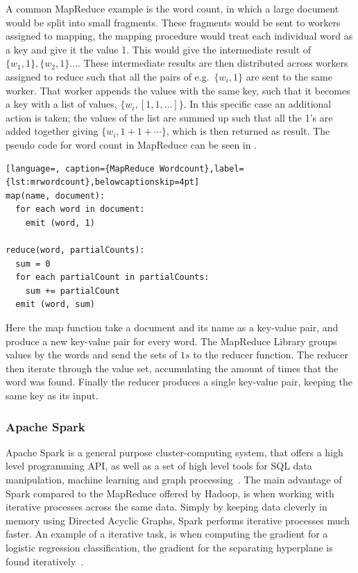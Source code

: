 A common MapReduce example is the word count, in which a large document would be split into small fragments. These fragments would be sent to workers assigned to mapping, the mapping procedure would treat each individual word as a key and give it the value 1. This would give the intermediate result of $\{w_1,1\}, \{w_2,1\} \dots$. These intermediate results are then distributed across workers assigned to reduce such that all the pairs of e.g.\ $\{w_i,1\}$ are sent to the same worker. That worker appends the values with the same key, such that it becomes a key with a list of values, $\{w_i, [1,1,\dots] \}$. In this specific case an additional action is taken; the values of the list are summed up such that all the 1's are added together giving $\{w_i,1+1+\cdots \}$, which is then returned as result. The pseudo code for word count in MapReduce can be seen in . 
\begin{lstlisting}[language=, caption={MapReduce Wordcount},label={lst:mrwordcount},belowcaptionskip=4pt]
map(name, document):
  for each word in document:
    emit (word, 1)

reduce(word, partialCounts):
  sum = 0
  for each partialCount in partialCounts:
    sum += partialCount
  emit (word, sum)
\end{lstlisting}
Here the map function take a document and its name as a key-value pair, and produce a new key-value pair for every word. The MapReduce Library groups values by the words and send the sets of $1s$ to the reducer function. The reducer then iterate through the value set, accumulating the amount of times that the word was found. Finally the reducer produces a single key-value pair, keeping the same key as its input.

\subsubsection{Apache Spark}\label{sec:spark}
Apache Spark is a general purpose cluster-computing system, that offers a high level programming API, as well as a set of high level tools for SQL data manipulation, machine learning and graph processing~\cite{sparkintro}. The main advantage of Spark compared to the MapReduce offered by Hadoop, is when working with iterative processes across the same data. Simply by keeping data cleverly in memory using Directed Acyclic Graphs, Spark performs iterative processes much faster. An example of a iterative task, is when computing the gradient for a logistic regression classification, the gradient for the separating hyperplane is found iteratively~\cite{ApacheSpark}.

